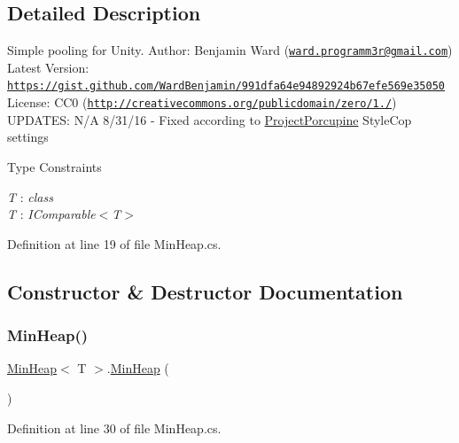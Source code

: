 \subsection{Detailed Description}
Simple pooling for Unity. Author\+: Benjamin Ward (\href{mailto:ward.programm3r@gmail.com}{\tt ward.\+programm3r@gmail.\+com}) Latest Version\+: \href{https://gist.github.com/WardBenjamin/991dfa64e94892924b67efe569e35050}{\tt https\+://gist.\+github.\+com/\+Ward\+Benjamin/991dfa64e94892924b67efe569e35050} License\+: C\+C0 (\href{http://creativecommons.org/publicdomain/zero/1.0/}{\tt http\+://creativecommons.\+org/publicdomain/zero/1./}) U\+P\+D\+A\+T\+ES\+: N/A 8/31/16 -\/ Fixed according to \hyperlink{namespace_project_porcupine}{Project\+Porcupine} Style\+Cop settings \begin{Desc}
\item[Type Constraints]\begin{description}
\item[{\em T} : {\em class}]\item[{\em T} : {\em I\+Comparable$<$T$>$}]\end{description}
\end{Desc}


Definition at line 19 of file Min\+Heap.\+cs.



\subsection{Constructor \& Destructor Documentation}
\mbox{\label{class_min_heap_ab12d943d2ccb65fcd4f22a803467ee75}} 
\subsubsection{\texorpdfstring{Min\+Heap()}{MinHeap()}\hspace{0.1cm}{\footnotesize\ttfamily [1/2]}}
{\footnotesize\ttfamily \hyperlink{class_min_heap}{Min\+Heap}$<$ T $>$.\hyperlink{class_min_heap}{Min\+Heap} (\begin{DoxyParamCaption}{ }\end{DoxyParamCaption})}



Definition at line 30 of file Min\+Heap.\+cs.

\mbox{\label{class_min_heap_a6cb34313b0c8c233f9a0cf84e1eaad69}} 

